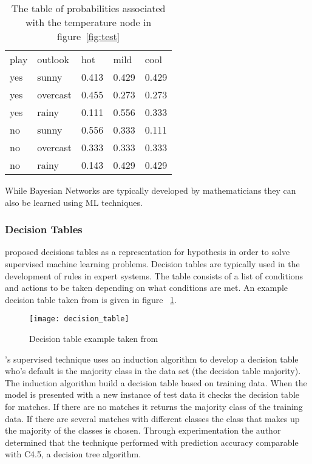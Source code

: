 \begin{table}[h]
\centering
\begin{tabular}{|ll|lll|}
\hline
 play & outlook & hot & mild & cool \\ \cline{1-5} 
 yes & sunny & 0.413 & 0.429 & 0.429 \\ 
 yes & overcast & 0.455 & 0.273 & 0.273 \\ 
 yes & rainy & 0.111 & 0.556 & 0.333 \\ 
 no & sunny & 0.556 & 0.333 & 0.111 \\ 
 no & overcast & 0.333 & 0.333 & 0.333 \\ 
 no & rainy & 0.143 & 0.429 & 0.429 \\ 
\hline
\end{tabular}
\caption{The table of probabilities associated with the temperature node in figure~\ref{fig:test} }
\label{tab:bayes_table}
\end{table}

While Bayesian Networks are typically developed by mathematicians they can also be learned using ML techniques. 


\subsubsection{Decision Tables}

\cite{kohavi1995power} proposed decisions tables as a representation for hypothesis in order to solve supervised machine learning problems. Decision tables are typically used in the development of rules in expert systems. The table consists of a list of conditions and actions to be taken depending on what conditions are met. An example decision table taken from \cite{hoffer1999modern} is given in figure ~\ref{fig:decision_table}.

\begin{figure}[!h]
\centering
\texttt{[image: decision\_table]}
\caption{Decision table example taken from \cite{hoffer1999modern}}
\label{fig:decision_table}
\end{figure}

\cite{kohavi1995power}'s supervised technique uses an induction algorithm to develop a decision table who's default is the majority class in the data set (the decision table majority). The induction algorithm build a decision table based on training data. When the model is presented with a new instance of test data it checks the decision table for matches. If there are no matches it returns the majority class of the training data. If there are several matches with different classes the class that makes up the majority of the classes is chosen. Through experimentation the author determined that the technique performed with prediction accuracy comparable with C4.5, a decision tree algorithm.

